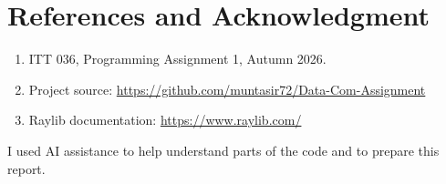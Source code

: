 \documentclass[10pt,a4paper]{article}
\begin{document}
\section*{References and Acknowledgment}
\begin{enumerate}[leftmargin=*,nosep]
    \item ITT 036, Programming Assignment 1, Autumn 2026.
    \item Project source:
    \url{https://github.com/muntasir72/Data-Com-Assignment}
    \item Raylib documentation: \url{https://www.raylib.com/}
\end{enumerate}

I used AI assistance to help understand parts of the code and to
prepare this report.
\end{document}
